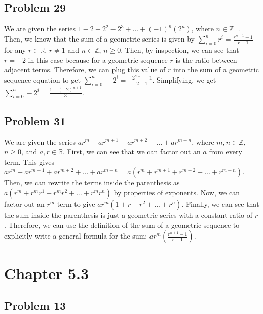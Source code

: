 \documentclass{article}
\begin{document}
\subsection*{Problem 29}

We are given the series $1-2+2^2-2^3+...+(-1)^{n}(2^n)$, where $n \in \mathbb{Z}^+$. Then, we know that the sum of a geometric series is given by $\sum\limits_{i=0}^{n} r^{i} = \frac{r^{n+1}-1}{r-1}$ for any $r \in \mathbb{R}$, $r \neq 1$ and $n \in \mathbb{Z}$, $n \geq 0$. Then, by inspection, we can see that $r=-2$ in this case because for a geometric sequence $r$ is the ratio between adjacent terms. Therefore, we can plug this value of $r$ into the sum of a geometric sequence equation to get $\sum\limits_{i=0}^{n} -2^{i} = \frac{-2^{n+1}-1}{-2-1}$. Simplifying, we get $\sum\limits_{i=0}^{n} -2^{i} = \frac{1-(-2)^{n+1}}{3}$.

\subsection*{Problem 31}

We are given the series $ar^m+ar^{m+1}+ar^{m+2}+...+ar^{m+n}$, where $m,n \in \mathbb{Z}$, $n \geq 0$, and $a,r \in \mathbb{R}$. First, we can see that we can factor out an $a$ from every term. This gives $ar^m+ar^{m+1}+ar^{m+2}+...+ar^{m+n} = a(r^m + r^{m+1} + r^{m+2} +...+r^{m+n})$. Then, we can rewrite the terms inside the parenthesis as  $a(r^m + r^{m}r^{1} + r^{m}r^{2} +...+r^{m}r^{n})$ by properties of exponents. Now, we can factor out an $r^m$ term to give $ar^{m}(1+r+r^{2}+...+r^{n})$. Finally, we can see that the sum inside the parenthesis is just a geometric series with a constant ratio of $r$. Therefore, we can use the definition of the sum of a geometric sequence to explicitly write a general formula for the sum: $ar^{m}(\frac{r^{n+1}-1}{r-1})$.

\section*{Chapter 5.3}

\subsection*{Problem 13}
\end{document}
